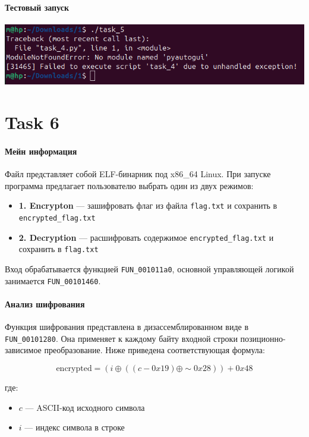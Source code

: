     \paragraph{Тестовый запуск}
    \includegraphics[width=1\linewidth]{static/_task_5.png}


    \section*{Task 6}

    \paragraph{Мейн информация}
    Файл представляет собой ELF-бинарник под x86\_64 Linux.
    При запуске программа предлагает пользователю выбрать один из двух режимов:
    \begin{itemize}
        \item \textbf{1. Encrypton} --- зашифровать флаг из файла \texttt{flag.txt} и сохранить в \texttt{encrypted\_flag.txt}
        \item \textbf{2. Decryption} --- расшифровать содержимое \texttt{encrypted\_flag.txt} и сохранить в \texttt{flag.txt}
    \end{itemize}

    Вход обрабатывается функцией \texttt{FUN\_001011a0}, основной управляющей логикой занимается \texttt{FUN\_00101460}.

    \paragraph{Анализ шифрования}

    Функция шифрования представлена в дизассемблированном виде в \texttt{FUN\_00101280}.
    Она применяет к каждому байту входной строки позиционно-зависимое преобразование.
    Ниже приведена соответствующая формула:

    \[
        \text{encrypted} = (i \oplus ((c - 0x19) \oplus \sim 0x28)) + 0x48
    \]

    где:
    \begin{itemize}
        \item $c$ — ASCII-код исходного символа
        \item $i$ — индекс символа в строке
    \end{itemize}

